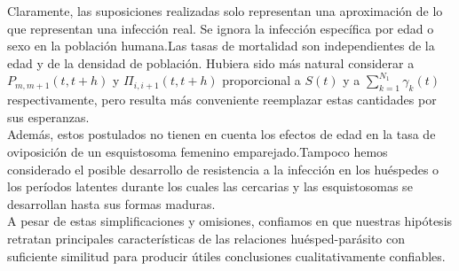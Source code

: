 \begin{Obs}
    Claramente, las suposiciones realizadas solo representan una aproximación de lo que representan una infección real. Se ignora la infección específica por edad o sexo en la población humana.Las tasas de mortalidad son independientes de la edad y de la densidad de población. Hubiera sido más natural considerar a $P_{m,m+1}(t,t+h)$ y $\Pi_{i,i+1}(t,t+h)$ proporcional a $S(t)$ y a $\sum_{k=1}^{N_1}\gamma_k(t)$ respectivamente, pero resulta más conveniente reemplazar estas cantidades por sus esperanzas.\\
    Además, estos postulados no tienen en cuenta los efectos de edad en la tasa de oviposición de un esquistosoma femenino emparejado.Tampoco hemos considerado el posible desarrollo de resistencia a la infección en los huéspedes o los períodos latentes durante los cuales las cercarias y las esquistosomas se desarrollan hasta sus formas maduras.\\A pesar de estas simplificaciones y omisiones, confiamos en que nuestras hipótesis retratan principales
    características de las relaciones huésped-parásito con suficiente similitud para producir útiles conclusiones cualitativamente confiables.
\end{Obs}